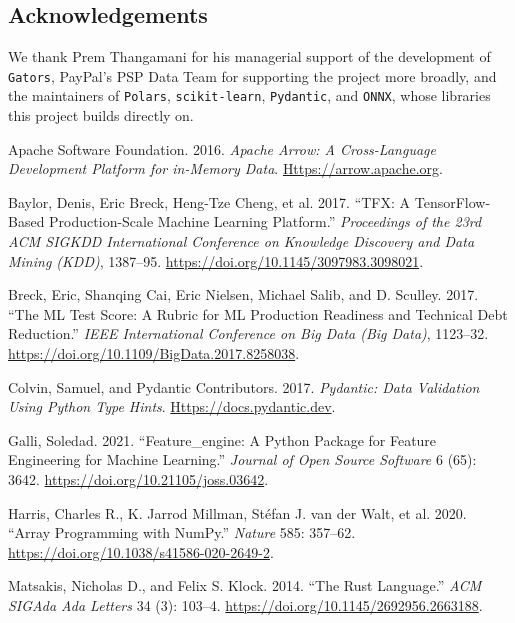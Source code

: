 \documentclass[
]{article}
\newlength{\cslhangindent}
\newenvironment{CSLReferences}[2] %
 {\begin{list}{}{%
  \setlength{\itemindent}{0pt}
  \setlength{\leftmargin}{0pt}
  \setlength{\parsep}{0pt}
  \ifodd #1
   \setlength{\leftmargin}{\cslhangindent}
   \setlength{\itemindent}{-1\cslhangindent}
  \fi
  \setlength{\itemsep}{#2\baselineskip}}}
 {\end{list}}
\begin{document}
\subsection{Acknowledgements}\label{acknowledgements}

We thank Prem Thangamani for his managerial support of the development
of \texttt{Gators}, PayPal's PSP Data Team for supporting the project
more broadly, and the maintainers of \texttt{Polars},
\texttt{scikit-learn}, \texttt{Pydantic}, and \texttt{ONNX}, whose
libraries this project builds directly on.

\protect{}\label{refs}
\begin{CSLReferences}{1}{1}
Apache Software Foundation. 2016. \emph{Apache Arrow: A Cross-Language
Development Platform for in-Memory Data}.
\href{https://arrow.apache.org}{Https://arrow.apache.org}.

Baylor, Denis, Eric Breck, Heng-Tze Cheng, et al. 2017. {``{TFX}: A
{T}ensor{F}low-Based Production-Scale Machine Learning Platform.''}
\emph{Proceedings of the 23rd ACM SIGKDD International Conference on
Knowledge Discovery and Data Mining (KDD)}, 1387--95.
\url{https://doi.org/10.1145/3097983.3098021}.

Breck, Eric, Shanqing Cai, Eric Nielsen, Michael Salib, and D. Sculley.
2017. {``The {ML} Test Score: A Rubric for {ML} Production Readiness and
Technical Debt Reduction.''} \emph{IEEE International Conference on Big
Data (Big Data)}, 1123--32.
\url{https://doi.org/10.1109/BigData.2017.8258038}.

Colvin, Samuel, and Pydantic Contributors. 2017. \emph{Pydantic: Data
Validation Using {P}ython Type Hints}.
\href{https://docs.pydantic.dev}{Https://docs.pydantic.dev}.

Galli, Soledad. 2021. {``Feature\_engine: A {P}ython Package for Feature
Engineering for Machine Learning.''} \emph{Journal of Open Source
Software} 6 (65): 3642. \url{https://doi.org/10.21105/joss.03642}.

Harris, Charles R., K. Jarrod Millman, Stéfan J. van der Walt, et al.
2020. {``Array Programming with {NumPy}.''} \emph{Nature} 585: 357--62.
\url{https://doi.org/10.1038/s41586-020-2649-2}.

Matsakis, Nicholas D., and Felix S. Klock. 2014. {``The {R}ust
Language.''} \emph{ACM SIGAda Ada Letters} 34 (3): 103--4.
\url{https://doi.org/10.1145/2692956.2663188}.


\end{CSLReferences}
\end{document}

